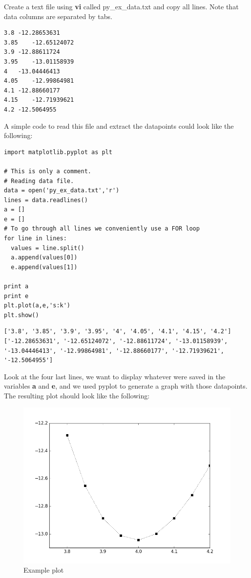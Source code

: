 \documentclass[11pt]{article}
\begin{document}
Create a text file using \textbf{vi} called py\_ex\_data.txt and copy all lines. Note that data columns are separated by tabs. 
\begin{verbatim}
3.8	-12.28653631
3.85	-12.65124072
3.9	-12.88611724
3.95	-13.01158939
4	-13.04446413
4.05	-12.99864981
4.1	-12.88660177
4.15	-12.71939621
4.2	-12.5064955
\end{verbatim}

A simple code to read this file and extract the datapoints could look like the following:
\begin{verbatim}
import matplotlib.pyplot as plt

# This is only a comment. 
# Reading data file.
data = open('py_ex_data.txt','r')
lines = data.readlines()
a = []
e = []
# To go through all lines we conveniently use a FOR loop
for line in lines:
  values = line.split()
  a.append(values[0])
  e.append(values[1])

print a
print e
plt.plot(a,e,'s:k')
plt.show()
\end{verbatim}

\begin{verbatim}
['3.8', '3.85', '3.9', '3.95', '4', '4.05', '4.1', '4.15', '4.2']
['-12.28653631', '-12.65124072', '-12.88611724', '-13.01158939', '-13.04446413', '-12.99864981', '-12.88660177', '-12.71939621', '-12.5064955']
\end{verbatim}

Look at the four last lines, we want to display whatever were saved in the variables \textbf{a} and \textbf{e}, and we used pyplot to generate a graph with those datapoints. The resulting plot should look like the following:

\begin{figure}[htb]
\centering
\includegraphics[width=.9\linewidth]{./figures/py_ex_data.png}
\caption{Example plot}
\end{figure}
\end{document}
